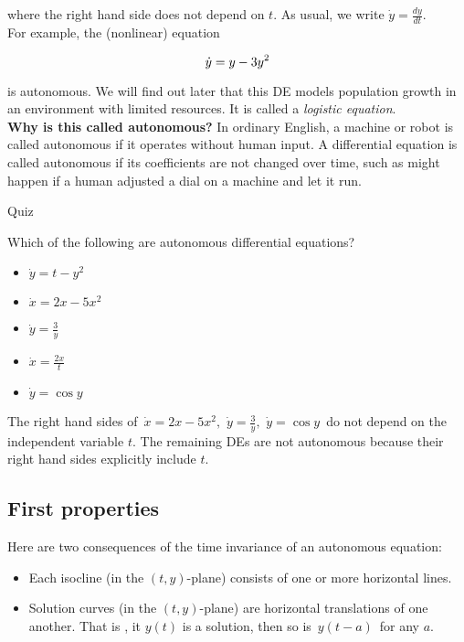 where the right hand side does not depend on $t$.
As usual, we write $\displaystyle \dot{y}=\frac{dy}{dt}$. \\

For example, the (nonlinear) equation

\begin{equation*}
  \displaystyle  \displaystyle \dot{y}=y-3y^2
\end{equation*}

is autonomous. We will find out later that this DE models population growth in an environment with limited resources. It is called a \textit{logistic equation}.\\

\textbf{Why is this called autonomous?} In ordinary English,
a machine or robot is called autonomous if it operates without human input.
A differential equation is called autonomous if its coefficients are not changed over time,
such as might happen if a human adjusted a dial on a machine and let it run.

\begin{exercise}
  Quiz
\end{exercise}

Which of the following are autonomous differential equations?

\begin{itemize}
\item $\dot{y}=t-y^2$
\item $\dot{x}=2x-5x^2$
\item $\displaystyle \dot{y}=\frac{3}{y}$
\item $\displaystyle \dot{x}=\frac{2x}{t}$
\item $\dot{y}=\cos y$
\end{itemize}

The right hand sides of $\, \dot{x}=2x-5x^2,\, \, \dot{y}=\frac{3}{y},\,\, \dot{y}=\cos y\,$
do not depend on the independent variable $t$.
The remaining DEs are not autonomous because their right hand sides explicitly include $t$.

\clearpage

\subsection{First properties}

Here are two consequences of the time invariance of an autonomous equation:

\begin{itemize}
\item Each isocline (in the $(t,y)$-plane) consists of one or more horizontal lines.
\item Solution curves (in the $(t,y)$-plane) are horizontal translations of one another.
  That is , it $y(t)$ is a solution, then so is $\, y(t - a) \,$ for any $a$. 
\end{itemize}


